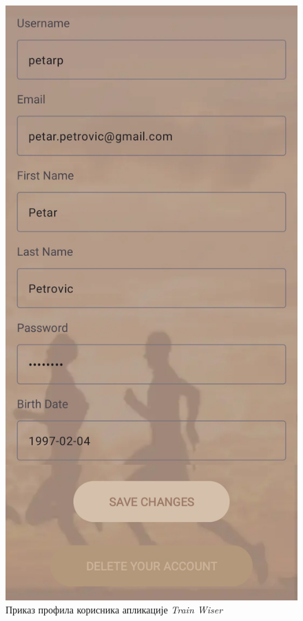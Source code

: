 \documentclass[12pt,oneside]{memoir}
\begin{document}
\begin{figure}[h]
  \centering
  \includegraphics[scale=0.1]{assets/pictures/app_screenshots/profile.jpg}
    \caption{Приказ профила корисника апликације \textit{Train Wiser}}
  \label{pic:profile}
\end{figure}
\end{document}
